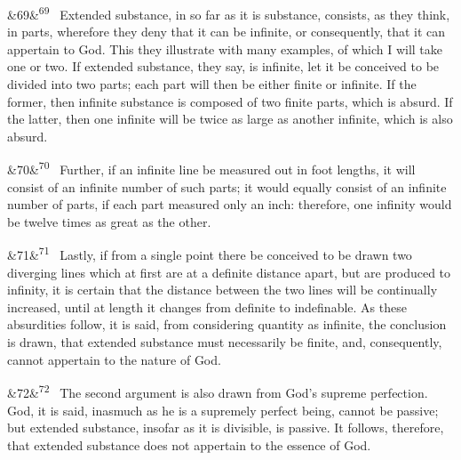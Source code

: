 \documentclass[12pt]{article}
\newcommand{\para}[1][]{\par\noindent\ifx&#1&\else\textsuperscript{\footnotesize #1}~\fi}
\begin{document}
\para[69] Extended substance, in so far as it is substance, consists, as they think, in parts, wherefore they deny that it can be infinite, or consequently, that it can appertain to God. This they illustrate with many examples, of which I will take one or two. If extended substance, they say, is infinite, let it be conceived to be divided into two parts; each part will then be either finite or infinite. If the former, then infinite substance is composed of two finite parts, which is absurd. If the latter, then one infinite will be twice as large as another infinite, which is also absurd.

\para[70] Further, if an infinite line be measured out in foot lengths, it will consist of an infinite number of such parts; it would equally consist of an infinite number of parts, if each part measured only an inch: therefore, one infinity would be twelve times as great as the other.

\para[71] Lastly, if from a single point there be conceived to be drawn two diverging lines which at first are at a definite distance apart, but are produced to infinity, it is certain that the distance between the two lines will be continually increased, until at length it changes from definite to indefinable. As these absurdities follow, it is said, from considering quantity as infinite, the conclusion is drawn, that extended substance must necessarily be finite, and, consequently, cannot appertain to the nature of God.

\para[72] The second argument is also drawn from God's supreme perfection. God, it is said, inasmuch as he is a supremely perfect being, cannot be passive; but extended substance, insofar as it is divisible, is passive. It follows, therefore, that extended substance does not appertain to the essence of God.
\end{document}
